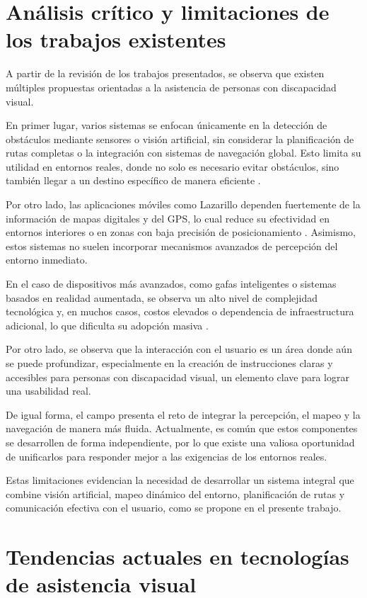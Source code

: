 \section{Análisis crítico y limitaciones de los trabajos existentes}

A partir de la revisión de los trabajos presentados, se observa que existen múltiples propuestas orientadas a la asistencia de personas con discapacidad visual.

En primer lugar, varios sistemas se enfocan únicamente en la detección de obstáculos mediante sensores o visión artificial, sin considerar la planificación de rutas completas o la integración con sistemas de navegación global. Esto limita su utilidad en entornos reales, donde no solo es necesario evitar obstáculos, sino también llegar a un destino específico de manera eficiente \cite{IPN_invidentes}.

Por otro lado, las aplicaciones móviles como Lazarillo dependen fuertemente de la información de mapas digitales y del GPS, lo cual reduce su efectividad en entornos interiores o en zonas con baja precisión de posicionamiento \cite{Lazarillo2023_app}. Asimismo, estos sistemas no suelen incorporar mecanismos avanzados de percepción del entorno inmediato.

En el caso de dispositivos más avanzados, como gafas inteligentes o sistemas basados en realidad aumentada, se observa un alto nivel de complejidad tecnológica y, en muchos casos, costos elevados o dependencia de infraestructura adicional, lo que dificulta su adopción masiva \cite{CIT2024_gafas}.

Por otro lado, se observa que la interacción con el usuario es un área donde aún se puede profundizar, especialmente en la creación de instrucciones claras y accesibles para personas con discapacidad visual, un elemento clave para lograr una usabilidad real.

De igual forma, el campo presenta el reto de integrar la percepción, el mapeo y la navegación de manera más fluida. Actualmente, es común que estos componentes se desarrollen de forma independiente, por lo que existe una valiosa oportunidad de unificarlos para responder mejor a las exigencias de los entornos reales.

Estas limitaciones evidencian la necesidad de desarrollar un sistema integral que combine visión artificial, mapeo dinámico del entorno, planificación de rutas y comunicación efectiva con el usuario, como se propone en el presente trabajo.

\section{Tendencias actuales en tecnologías de asistencia visual}

